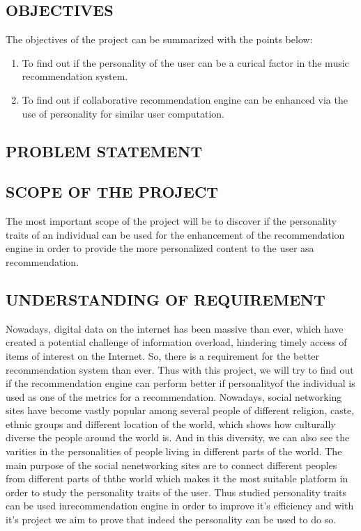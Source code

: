 \subsection{OBJECTIVES}
The objectives of the project can be summarized with the points below:
\begin{enumerate}
\item To find out if the personality of the user can be a curical factor in the music recommendation system.
\item To find out if collaborative recommendation engine can be enhanced via the use of personality for similar user computation.
\end{enumerate}

\subsection{PROBLEM STATEMENT}

\subsection{SCOPE OF THE PROJECT}
The most important scope of the project will be to discover if the personality traits of an individual can be used for the enhancement of the recommendation engine in order to provide the more personalized content to the user asa recommendation.

\subsection{UNDERSTANDING OF REQUIREMENT}
Nowadays, digital data on the internet has been massive than ever, which have created a potential challenge of information overload, hindering timely access of items of interest on the Internet. So, there is a requirement for the better recommendation system than ever. Thus with this project, we will try to find out if the recommendation engine can perform better if personalityof the individual is used as one of the metrics for a recommendation. Nowadays, social networking sites have become vastly popular among several people of different religion, caste, ethnic groups and different location of the world, which shows how culturally diverse the people around the world is. And in this diversity, we can also see the varities in the personalities of people living in different parts of the world. The main purpose of the social nenetworking sites are to connect different peoples from different parts of ththe world which makes it the most suitable platform in order to study the personality traits of the user. Thus studied personality traits can be used inrecommendation engine in order to improve it's efficiency and with it's project we aim to prove that indeed the personality can be used to do so.

